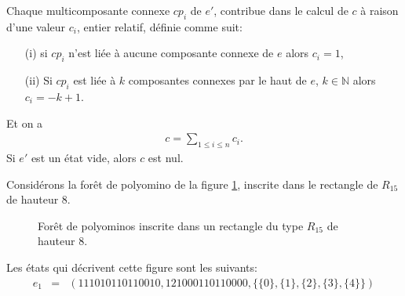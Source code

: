 Chaque  multicomposante connexe  $cp_{i}$ de $e'$, contribue  dans le calcul de $c$ à raison d'une valeur $c_{i}$, entier relatif, définie comme suit:
\begin{itemize}\label{rule1}
\item[(i)] si $cp_{i}$ n'est liée à aucune composante connexe de  $e$ alors $c_{i}=1$, 
\item[(ii)] Si $cp_{i}$  est liée à $k$ composantes connexes par le haut de $e$, $k\in \mathbb{N}$ alors $c_{i}=-k+1$.
\end{itemize}
Et on a 
\begin{eqnarray*}\label{cform}
c= \sum_{1\leq i \leq n}c_{i}.
\end{eqnarray*}
Si $e'$ est un état vide, alors $c$ est nul.
\begin{Ex}\label{exrcl}
Considérons la forêt de polyomino de la figure \ref{fig2chap3}, inscrite dans le rectangle de $R_{15}$ de hauteur $8$.
\begin{figure}[!htb]
\begin{minipage}[c]{.22\linewidth}
  \centering
 \end{minipage}\hfill
\begin{minipage}[c]{.67\linewidth}
  \centering
\begin{logicpuzzle}[rows=8,columns=15,color=cyan!100,width=750px,scale=0.5]
\end{logicpuzzle}
\end{minipage}
\caption{\label{fig2chap3} Forêt de polyominos  inscrite dans un rectangle du type $R_{15}$  de hauteur $8$.}
\end{figure}
Les états qui décrivent cette figure sont les suivants:
\begin{eqnarray*}
e_{1} & = & (111010110110010,121000110110000,\{\{0\},\{1\},\{2\},\{3\},\{4\}\})\\

\end{eqnarray*}
\end{Ex}
